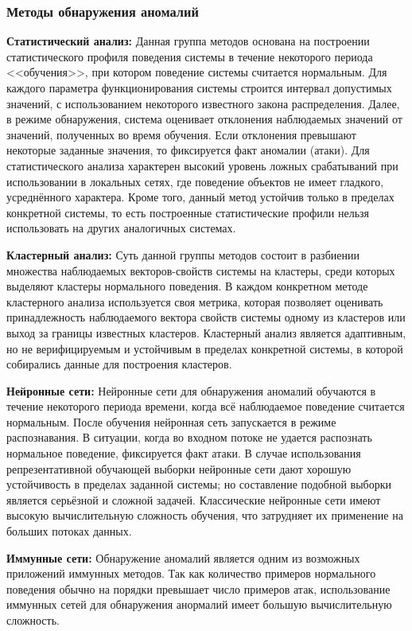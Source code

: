 \subsubsection{Методы обнаружения аномалий}

\textbf{Статистический анализ:} Данная группа методов основана на построении статистического профиля поведения системы в течение некоторого периода <<обучения>>, при котором поведение системы считается нормальным. Для каждого параметра функционирования системы строится интервал допустимых значений, с использованием некоторого известного закона распределения. Далее, в режиме обнаружения, система оценивает отклонения наблюдаемых значений от значений, полученных во время обучения. Если отклонения превышают некоторые заданные значения, то фиксируется факт аномалии (атаки). Для статистического анализа характерен высокий уровень ложных срабатываний при использовании в локальных сетях, где поведение объектов не имеет гладкого, усреднённого характера. Кроме того, данный метод устойчив только в пределах конкретной системы, то есть построенные статистические профили нельзя использовать на других аналогичных системах. 

\textbf{Кластерный анализ:} Суть данной группы методов состоит в разбиении множества наблюдаемых векторов-свойств системы на кластеры, среди которых выделяют кластеры нормального поведения. В каждом конкретном методе кластерного анализа используется своя метрика, которая позволяет оценивать принадлежность наблюдаемого вектора свойств системы одному из кластеров или выход за границы известных кластеров. Кластерный анализ является адаптивным, но не верифицируемым и устойчивым в пределах конкретной системы, в которой собирались данные для построения кластеров.

\textbf{Нейронные сети:} Нейронные сети для обнаружения аномалий обучаются в течение некоторого периода времени, когда всё наблюдаемое поведение считается нормальным. После обучения нейронная сеть запускается в режиме распознавания. В ситуации, когда во входном потоке не удается распознать нормальное поведение, фиксируется факт атаки. В случае использования репрезентативной обучающей выборки нейронные сети дают хорошую устойчивость в пределах заданной системы; но составление подобной выборки является серьёзной и сложной задачей.  Классические нейронные сети имеют высокую вычислительную сложность обучения, что затрудняет их применение на больших потоках данных. 

\textbf{Иммунные сети:} Обнаружение аномалий является одним из возможных приложений иммунных методов. Так как количество примеров нормального поведения обычно на порядки превышает число примеров атак, использование иммунных сетей для обнаружения анормалий имеет большую вычислительную сложность. 

